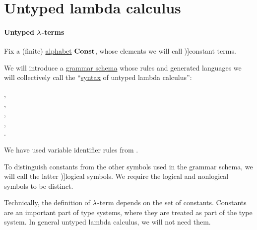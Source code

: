 \section{Untyped lambda calculus}\label{sec:untyped_lambda_calculus}

\paragraph{Untyped \( \synlambda \)-terms}

\begin{definition}\label{def:lambda_term}\mimprovised
  Fix a (finite) \hyperref[def:formal_language/alphabet]{alphabet} \( \op*{Const} \), whose elements we will call \term[en=constant (\cite[202]{Andrews2002STT})]{constant terms}.

  We will introduce a \hyperref[def:formal_grammar/schema]{grammar schema} whose rules and generated languages we will collectively call the \enquote{\hyperref[con:syntax_semantics_duality]{syntax} of untyped lambda calculus}:
  \begin{bnf*}
        {}, \\
            { \bnfor {}}, \\
     {\bnftsq{\( ( \)} \bnfsp {} \bnfsp {} \bnfsp \bnftsq{\( ) \)}}, \\
     {\bnftsq{\( ( \)} \bnfsp \bnftsq{\( \synlambda \)} \bnfsp {} \bnfsp {} \bnfsp {} \bnfsp \bnftsq{\( ) \)}}, \\
            { \bnfor {} \bnfor {}}.
  \end{bnf*}

  We have used variable identifier rules from .

  To distinguish constants from the other symbols used in the grammar schema, we will call the latter \term[en=logical symbol (\cite[2]{Hinman2005Logic})]{logical symbols}. We require the logical and nonlogical symbols to be distinct.

  \begin{thmenum}
     Technically, the definition of \( \synlambda \)-term depends on the set of constants. Constants are an important part of type systems, where they are treated as part of the type system. In general untyped lambda calculus, we will not need them.


\end{thmenum}
\end{definition}
